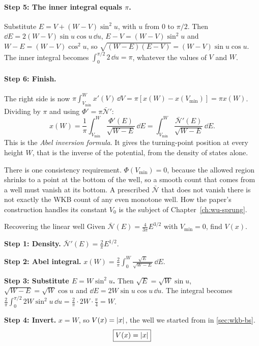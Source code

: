 \paragraph{Step 5: The inner integral equals $\pi$.} Substitute $E=V+(W-V)\sin^2u$, with $u$ from $0$ to $\pi/2$. Then $\dd E=2(W-V)\sin u\cos u\,\dd u$, $E-V=(W-V)\sin^2u$ and $W-E=(W-V)\cos^2u$, so $\sqrt{(W-E)(E-V)}=(W-V)\sin u\cos u$. The inner integral becomes $\int_0^{\pi/2}2\,\dd u=\pi$, whatever the values of $V$ and $W$.

\paragraph{Step 6: Finish.} The right side is now $\pi\int_{V_{\min}}^Wx'(V)\,\dd V=\pi[x(W)-x(V_{\min})]=\pi x(W)$. Dividing by $\pi$ and using $\Phi'=\pi\bar{\mathcal N}'$:
\begin{equation}
\boxed{x(W)=\frac1\pi\int_{V_{\min}}^{W}\frac{\Phi'(E)}{\sqrt{W-E}}\,\dd E=\int_{V_{\min}}^{W}\frac{\bar{\mathcal N}'(E)}{\sqrt{W-E}}\,\dd E .}
\label{eq:wkb-abelinv}
\end{equation}
This is the \emph{Abel inversion formula}. It gives the turning-point position at every height $W$, that is the inverse of the potential, from the density of states alone.

There is one consistency requirement. $\Phi(V_{\min})=0$, because the allowed region shrinks to a point at the bottom of the well, so a smooth count that comes from a well must vanish at its bottom. A prescribed $\bar{\mathcal N}$ that does not vanish there is not exactly the WKB count of any even monotone well. How the paper's construction handles its constant $V_0$ is the subject of Chapter~\ref{ch:wu-sprung}.

\begin{sample}{Recovering the linear well}
Given $\bar{\mathcal N}(E)=\frac{4}{3\pi}E^{3/2}$ with $V_{\min}=0$, find $V(x)$.

\textbf{Step 1: Density.} $\bar{\mathcal N}'(E)=\frac2\pi E^{1/2}$.

\textbf{Step 2: Abel integral.} $x(W)=\frac2\pi\int_0^W\frac{\sqrt E}{\sqrt{W-E}}\,\dd E$.

\textbf{Step 3: Substitute $E=W\sin^2u$.} Then $\sqrt E=\sqrt W\sin u$, $\sqrt{W-E}=\sqrt W\cos u$ and $\dd E=2W\sin u\cos u\,\dd u$. The integral becomes $\frac2\pi\int_0^{\pi/2}2W\sin^2u\,\dd u=\frac2\pi\cdot2W\cdot\frac\pi4=W$.

\textbf{Step 4: Invert.} $x=W$, so $V(x)=\left\lvert x\right\rvert$, the well we started from in \cref{sec:wkb-bs}.
\[
\boxed{V(x)=\left\lvert x\right\rvert}
\]
\end{sample}

